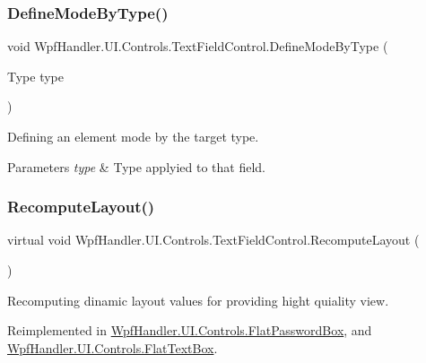 \subsubsection{\texorpdfstring{Define\+Mode\+By\+Type()}{DefineModeByType()}}
{\footnotesize\ttfamily void Wpf\+Handler.\+U\+I.\+Controls.\+Text\+Field\+Control.\+Define\+Mode\+By\+Type (\begin{DoxyParamCaption}\item[{Type}]{type }\end{DoxyParamCaption})}



Defining an element mode by the target type. 


\begin{DoxyParams}{Parameters}
{\em type} & Type applyied to that field.\\
\hline
\end{DoxyParams}
\mbox{\label{class_wpf_handler_1_1_u_i_1_1_controls_1_1_text_field_control_aaf6c7c81a06ea18f7fd0b709fb9f26b3}} 
\subsubsection{\texorpdfstring{Recompute\+Layout()}{RecomputeLayout()}}
{\footnotesize\ttfamily virtual void Wpf\+Handler.\+U\+I.\+Controls.\+Text\+Field\+Control.\+Recompute\+Layout (\begin{DoxyParamCaption}{ }\end{DoxyParamCaption})\hspace{0.3cm}{\ttfamily [virtual]}}



Recomputing dinamic layout values for providing hight quiality view. 



Reimplemented in \mbox{\hyperlink{class_wpf_handler_1_1_u_i_1_1_controls_1_1_flat_password_box_abe285f06393d65f13af4b293f9eb0941}{Wpf\+Handler.\+U\+I.\+Controls.\+Flat\+Password\+Box}}, and \mbox{\hyperlink{class_wpf_handler_1_1_u_i_1_1_controls_1_1_flat_text_box_af96bd0b4244565a1ca7a137d56296cda}{Wpf\+Handler.\+U\+I.\+Controls.\+Flat\+Text\+Box}}.

